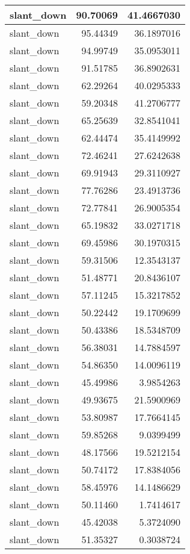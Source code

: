 \documentclass[
]{book}
\theoremstyle{definition}
\theoremstyle{definition}
\theoremstyle{definition}
\theoremstyle{definition}
\theoremstyle{remark}
\begin{document}
\begin{tabular}{l|r|r}
\hline
slant\_down & 90.70069 & 41.4667030\\
\hline
slant\_down & 95.44349 & 36.1897016\\
\hline
slant\_down & 94.99749 & 35.0953011\\
\hline
slant\_down & 91.51785 & 36.8902631\\
\hline
slant\_down & 62.29264 & 40.0295333\\
\hline
slant\_down & 59.20348 & 41.2706777\\
\hline
slant\_down & 65.25639 & 32.8541041\\
\hline
slant\_down & 62.44474 & 35.4149992\\
\hline
slant\_down & 72.46241 & 27.6242638\\
\hline
slant\_down & 69.91943 & 29.3110927\\
\hline
slant\_down & 77.76286 & 23.4913736\\
\hline
slant\_down & 72.77841 & 26.9005354\\
\hline
slant\_down & 65.19832 & 33.0271718\\
\hline
slant\_down & 69.45986 & 30.1970315\\
\hline
slant\_down & 59.31506 & 12.3543137\\
\hline
slant\_down & 51.48771 & 20.8436107\\
\hline
slant\_down & 57.11245 & 15.3217852\\
\hline
slant\_down & 50.22442 & 19.1709699\\
\hline
slant\_down & 50.43386 & 18.5348709\\
\hline
slant\_down & 56.38031 & 14.7884597\\
\hline
slant\_down & 54.86350 & 14.0096119\\
\hline
slant\_down & 45.49986 & 3.9854263\\
\hline
slant\_down & 49.93675 & 21.5900969\\
\hline
slant\_down & 53.80987 & 17.7664145\\
\hline
slant\_down & 59.85268 & 9.0399499\\
\hline
slant\_down & 48.17566 & 19.5212154\\
\hline
slant\_down & 50.74172 & 17.8384056\\
\hline
slant\_down & 58.45976 & 14.1486629\\
\hline
slant\_down & 50.11460 & 1.7414617\\
\hline
slant\_down & 45.42038 & 5.3724090\\
\hline
slant\_down & 51.35327 & 0.3038724\\

\end{tabular}
\end{document}
